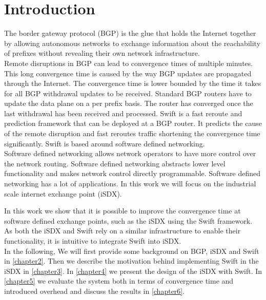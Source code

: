 

\chapter{\label{introduction}Introduction}
The border gateway protocol (BGP) is the glue that holds the Internet together by allowing autonomous networks to exchange information about the reachability of prefixes without revealing their own network infrastructure. \\
Remote disruptions in BGP can lead to convergence times of multiple minutes. This long convergence time is caused by the way BGP updates are propagated through the Internet. The convergence time is lower bounded by the time it takes for all BGP withdrawal updates to be received. Standard BGP routers have to update the data plane on a per prefix basis. The router has converged once the last withdrawal has been received and processed. Swift is a fast reroute and prediction framework that can be deployed at a BGP router. It predicts the cause of the remote disruption and fast reroutes traffic shortening the convergence time significantly. Swift is based around software defined networking. \\
Software defined networking allows network operators to have more control over the network routing. Software defined networking abstracts lower level functionality and makes network control directly programmable. Software defined networking has a lot of applications. In this work we will focus on the industrial scale internet exchange point (iSDX). 

In this work we show that it is possible to improve the convergence time at software defined exchange points, such as the iSDX using the Swift framework. As both the iSDX and Swift rely on a similar infrastructure to enable their functionality, it is intuitive to integrate Swift into iSDX. \\

In the following, We will first provide some background on BGP, iSDX and Swift in \ref{chapter2}. Then we describe the motivation behind implementing Swift in the iSDX in \ref{chapter3}. In \ref{chapter4} we present the design of the iSDX with Swift. In \ref{chapter5} we evaluate the system both in terms of convergence time and introduced overhead and discuss the results in \ref{chapter6}. 



